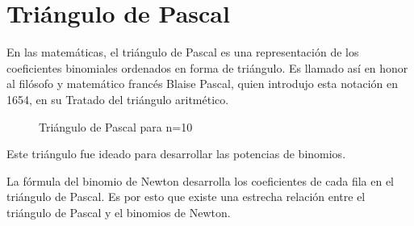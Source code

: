 \section*{Triángulo de Pascal}

En las matemáticas, el triángulo de Pascal es una representación de los
coeficientes binomiales ordenados en forma de triángulo. Es llamado así en honor
al filósofo y matemático francés Blaise Pascal, quien introdujo esta notación en
1654, en su Tratado del triángulo aritmético.

\newcommand{\pasc}[2]{
	\pgfkeys{/pgf/fpu}
	\pgfmathparse{round(#1!/((#1-#2)!*#2!))}
	\pgfmathfloattoint{\pgfmathresult}
	\pgfmathresult
}

\begin{figure}[h]
	\centering
	\caption{Triángulo de Pascal para n=10}
\end{figure}

Este triángulo fue ideado para desarrollar las potencias de binomios.

La fórmula del binomio de Newton desarrolla los coeficientes de cada fila en el
triángulo de Pascal. Es por esto que existe una estrecha relación entre el
triángulo de Pascal y el binomios de Newton.

